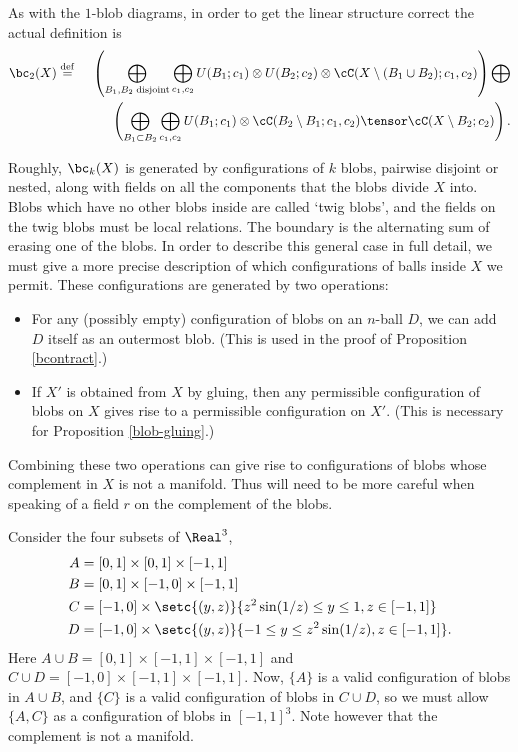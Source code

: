 As with the $1$-blob diagrams, in order to get the linear structure correct the actual definition is 
\begin{eqnarray*}
	\bc_2(X) & \deq &
	\left( 
		\bigoplus_{B_1, B_2\; \text{disjoint}} \bigoplus_{c_1, c_2}
			U(B_1; c_1) \otimes U(B_2; c_2) \otimes \lf(X\setmin (B_1\cup B_2); c_1, c_2)
	\right)  \bigoplus \\
	&& \quad\quad  \left( 
		\bigoplus_{B_1 \subset B_2} \bigoplus_{c_1, c_2}
			U(B_1; c_1) \otimes \lf(B_2 \setmin B_1; c_1, c_2) \tensor \cC(X \setminus B_2; c_2)
	\right) .
\end{eqnarray*}

\medskip

Roughly, $\bc_k(X)$ is generated by configurations of $k$ blobs, pairwise disjoint or nested, along with fields on all the components that the blobs divide $X$ into. Blobs which have no other blobs inside are called `twig blobs', and the fields on the twig blobs must be local relations.
The boundary is the alternating sum of erasing one of the blobs.
In order to describe this general case in full detail, we must give a more precise description of
which configurations of balls inside $X$ we permit.
These configurations are generated by two operations:
\begin{itemize}
\item For any (possibly empty) configuration of blobs on an $n$-ball $D$, we can add
$D$ itself as an outermost blob.
(This is used in the proof of Proposition \ref{bcontract}.)
\item If $X'$ is obtained from $X$ by gluing, then any permissible configuration of blobs
on $X$ gives rise to a permissible configuration on $X'$.
(This is necessary for Proposition \ref{blob-gluing}.)
\end{itemize}
Combining these two operations can give rise to configurations of blobs whose complement in $X$ is not
a manifold. 
Thus will need to be more careful when speaking of a field $r$ on the complement of the blobs.

\begin{example}
Consider the four subsets of $\Real^3$,
\begin{align*}
A & = [0,1] \times [0,1] \times [-1,1] \\
B & = [0,1] \times [-1,0] \times [-1,1] \\
C & = [-1,0] \times \setc{(y,z)}{z^2 \sin(1/z) \leq y \leq 1, z \in [-1,1]} \\
D & = [-1,0] \times \setc{(y,z)}{-1 \leq y \leq z^2 \sin(1/z), z \in [-1,1]}.
\end{align*}
Here $A \cup B = [0,1] \times [-1,1] \times [-1,1]$ and $C \cup D = [-1,0] \times [-1,1] \times [-1,1]$. Now, $\{A\}$ is a valid configuration of blobs in $A \cup B$, and $\{C\}$ is a valid configuration of blobs in $C \cup D$, so we must allow $\{A, C\}$ as a configuration of blobs in $[-1,1]^3$. Note however that the complement is not a manifold.
\end{example}

